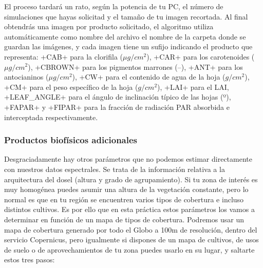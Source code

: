 \documentclass[a4paper,11pt]{article}
\begin{document}
      El proceso tardará un rato, según la potencia de tu PC, el número de simulaciones que hayas solicitad y el tamaño de tu imagen recortada. Al final obtendrás una imagen por producto solicitado, el algoritmo utiliza automáticamente como nombre del archivo el nombre de la carpeta donde se guardan las imágenes, y cada imagen tiene un sufijo indicando el producto que representa: \cverb+CAB+ para la clorifila ($\mu g/cm^2$), \cverb+CAR+ para los carotenoides ($\mu g/cm^2$), \cverb+CBROWN+ para los pigmentos marrones (--), \cverb+ANT+ para los antocianinos ($\mu g/cm^2$), \cverb+CW+ para el contenido de agua de la hoja ($g/cm^2$), \cverb+CM+ para el peso específico de la hoja ($g/cm^2$), \cverb+LAI+ para el LAI, \cverb+LEAF_ANGLE+ para el ángulo de inclinación típico de las hojas (º), \cverb+FAPAR+ y \cverb+FIPAR+ para la fracción de radiación PAR absorbida e interceptada respectivamente.
     
    \subsubsection{Productos biofísicos adicionales}
      Desgraciadamente hay otros parámetros que no podemos estimar directamente con nuestros datos espectrales. Se trata de la información relativa a la arquitectura del dosel (altura y grado de agrupamiento). Si tu zona de interés es muy homogénea puedes asumir una altura de la vegetación constante, pero lo normal es que en tu región se encuentren varios tipos de cobertura e incluso distintos cultivos. Es por ello que en esta práctica estos parámetros los vamos a determinar en función de un mapa de tipos de cobertura. Podremos usar un mapa de cobertura generado por todo el Globo a 100m de resolución, dentro del servicio Copernicus, pero igualmente si dispones de un mapa de cultivos, de usos de suelo o de aprovechamientos de tu zona puedes usarlo en su lugar, y saltarte estos tres pasos:
      
\end{document}
